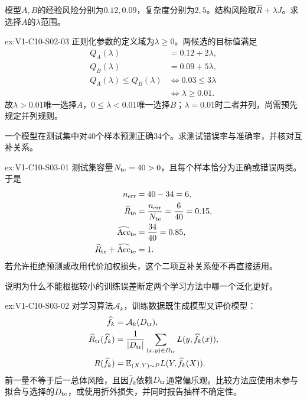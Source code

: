 \begin{SLChapterExercisePairSection}
\begin{exercise}\label{ex:V1-C10-S02-03}
模型$A,B$的经验风险分别为$0.12,0.09$，复杂度分别为$2,5$。结构风险取$\widehat R+\lambda J$。求选择$A$的$\lambda$范围。
\end{exercise}
\label{sol:V1-C10-S02-03}
\begin{chapterexercisesolution}{ex:V1-C10-S02-03}
正则化参数的定义域为$\lambda\ge0$。两候选的目标值满足
\[
\begin{aligned}
Q_A(\lambda)&=0.12+2\lambda,\\
Q_B(\lambda)&=0.09+5\lambda,\\
Q_A(\lambda)\le Q_B(\lambda)
  &\Longleftrightarrow 0.03\le3\lambda\\
  &\Longleftrightarrow \lambda\ge0.01.
\end{aligned}
\]
故$\lambda>0.01$唯一选择$A$，$0\le\lambda<0.01$唯一选择$B$；$\lambda=0.01$时二者并列，尚需预先规定并列规则。
\end{chapterexercisesolution}

\begin{exercise}\label{ex:V1-C10-S03-01}
一个模型在测试集中对40个样本预测正确34个。求测试错误率与准确率，并核对互补关系。
\end{exercise}
\label{sol:V1-C10-S03-01}
\begin{chapterexercisesolution}{ex:V1-C10-S03-01}
测试集容量$N_{\rm te}=40>0$，且每个样本恰分为正确或错误两类。于是
\[
\begin{aligned}
n_{\rm err}&=40-34=6,\\
\widehat R_{\rm te}
  &=\frac{n_{\rm err}}{N_{\rm te}}=\frac6{40}=0.15,\\
\widehat{\rm Acc}_{\rm te}
  &=\frac{34}{40}=0.85,\\
\widehat R_{\rm te}+\widehat{\rm Acc}_{\rm te}&=1.
\end{aligned}
\]
若允许拒绝预测或改用代价加权损失，这个二项互补关系便不再直接适用。
\end{chapterexercisesolution}

\begin{exercise}\label{ex:V1-C10-S03-02}
说明为什么不能根据较小的训练误差断定两个学习方法中哪一个泛化更好。
\end{exercise}
\label{sol:V1-C10-S03-02}
\begin{chapterexercisesolution}{ex:V1-C10-S03-02}
对学习算法$\mathcal A_k$，训练数据既生成模型又评价模型：
\[
\begin{aligned}
\widehat f_k&=\mathcal A_k(D_{\rm tr}),\\
\widehat R_{\rm tr}(\widehat f_k)
  &=\frac1{|D_{\rm tr}|}\sum_{(x,y)\in D_{\rm tr}}
    L(y,\widehat f_k(x)),\\
R(\widehat f_k)
  &=\mathbb E_{(X,Y)\sim P}
    L(Y,\widehat f_k(X)).
\end{aligned}
\]
前一量不等于后一总体风险，且因$\widehat f_k$依赖$D_{\rm tr}$通常偏乐观。比较方法应使用未参与拟合与选择的$D_{\rm te}$，或使用折外损失，并同时报告抽样不确定性。
\end{chapterexercisesolution}


\end{SLChapterExercisePairSection}
